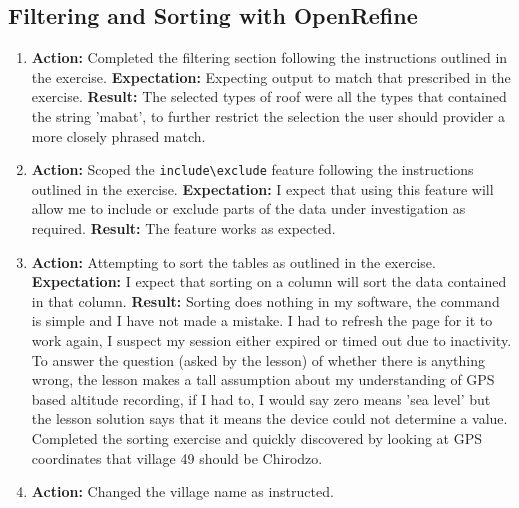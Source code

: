 \documentclass{article}
\begin{document}
\subsection{Filtering and Sorting with OpenRefine}
\begin{enumerate}
    \item \textbf{Action: }Completed the filtering section following the instructions outlined in the exercise.
    \subitem \textbf{Expectation: }Expecting output to match that prescribed in the exercise.
    \subitem \textbf{Result: } The selected types of roof were all the types that contained the string 'mabat', to further restrict the selection the user should provider a more closely phrased match.
    \item \textbf{Action: }Scoped the \verb|include\exclude| feature following the instructions outlined in the exercise.
    \subitem \textbf{Expectation: }I expect that using this feature will allow me to include or exclude parts of the data under investigation as required.
    \subitem \textbf{Result: }The feature works as expected.
    \item \textbf{Action: }Attempting to sort the tables as outlined in the exercise.
    \subitem \textbf{Expectation: }I expect that sorting on a column will sort the data contained in that column.
    \subitem \textbf {Result: }Sorting does nothing in my software, the command is simple and I have not made a mistake. I had to refresh the page for it to work again, I suspect my session either expired or timed out due to inactivity. To answer the question (asked by the lesson) of whether there is anything wrong, the lesson makes a tall assumption about my understanding of GPS based altitude recording, if I had to, I would say zero means 'sea level' but the lesson solution says that it means the device could not determine a value. Completed the sorting exercise and quickly discovered by looking at GPS coordinates that village 49 should be Chirodzo.
    \item \textbf{Action: }Changed the village name as instructed.
\end{enumerate}
\end{document}

